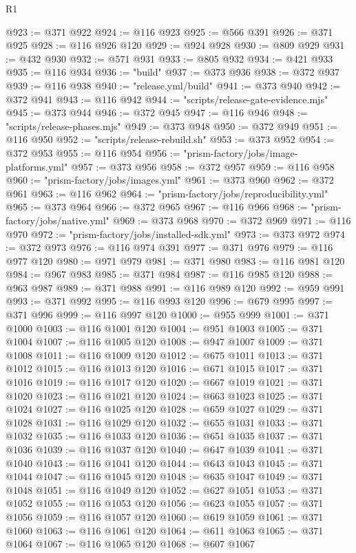 \begin{lexlean}{R1}
\begin{coremodule}
@923 := @371 @922
@924 := @116 @923
@925 := @566 @391
@926 := @371 @925
@928 := @116 @926 @120
@929 := @924 @928
@930 := @809 @929
@931 := @432 @930
@932 := @571 @931
@933 := @805 @932
@934 := @421 @933
@935 := @116 @934
@936 := "build"
@937 := @373 @936
@938 := @372 @937
@939 := @116 @938
@940 := "release.yml/build"
@941 := @373 @940
@942 := @372 @941
@943 := @116 @942
@944 := "scripts/release-gate-evidence.mjs"
@945 := @373 @944
@946 := @372 @945
@947 := @116 @946
@948 := "scripts/release-phases.mjs"
@949 := @373 @948
@950 := @372 @949
@951 := @116 @950
@952 := "scripts/release-rebuild.sh"
@953 := @373 @952
@954 := @372 @953
@955 := @116 @954
@956 := "prism-factory/jobs/image-platforms.yml"
@957 := @373 @956
@958 := @372 @957
@959 := @116 @958
@960 := "prism-factory/jobs/images.yml"
@961 := @373 @960
@962 := @372 @961
@963 := @116 @962
@964 := "prism-factory/jobs/reproducibility.yml"
@965 := @373 @964
@966 := @372 @965
@967 := @116 @966
@968 := "prism-factory/jobs/native.yml"
@969 := @373 @968
@970 := @372 @969
@971 := @116 @970
@972 := "prism-factory/jobs/installed-sdk.yml"
@973 := @373 @972
@974 := @372 @973
@976 := @116 @974 @391
@977 := @371 @976
@979 := @116 @977 @120
@980 := @971 @979
@981 := @371 @980
@983 := @116 @981 @120
@984 := @967 @983
@985 := @371 @984
@987 := @116 @985 @120
@988 := @963 @987
@989 := @371 @988
@991 := @116 @989 @120
@992 := @959 @991
@993 := @371 @992
@995 := @116 @993 @120
@996 := @679 @995
@997 := @371 @996
@999 := @116 @997 @120
@1000 := @955 @999
@1001 := @371 @1000
@1003 := @116 @1001 @120
@1004 := @951 @1003
@1005 := @371 @1004
@1007 := @116 @1005 @120
@1008 := @947 @1007
@1009 := @371 @1008
@1011 := @116 @1009 @120
@1012 := @675 @1011
@1013 := @371 @1012
@1015 := @116 @1013 @120
@1016 := @671 @1015
@1017 := @371 @1016
@1019 := @116 @1017 @120
@1020 := @667 @1019
@1021 := @371 @1020
@1023 := @116 @1021 @120
@1024 := @663 @1023
@1025 := @371 @1024
@1027 := @116 @1025 @120
@1028 := @659 @1027
@1029 := @371 @1028
@1031 := @116 @1029 @120
@1032 := @655 @1031
@1033 := @371 @1032
@1035 := @116 @1033 @120
@1036 := @651 @1035
@1037 := @371 @1036
@1039 := @116 @1037 @120
@1040 := @647 @1039
@1041 := @371 @1040
@1043 := @116 @1041 @120
@1044 := @643 @1043
@1045 := @371 @1044
@1047 := @116 @1045 @120
@1048 := @635 @1047
@1049 := @371 @1048
@1051 := @116 @1049 @120
@1052 := @627 @1051
@1053 := @371 @1052
@1055 := @116 @1053 @120
@1056 := @623 @1055
@1057 := @371 @1056
@1059 := @116 @1057 @120
@1060 := @619 @1059
@1061 := @371 @1060
@1063 := @116 @1061 @120
@1064 := @611 @1063
@1065 := @371 @1064
@1067 := @116 @1065 @120
@1068 := @607 @1067

\end{coremodule}
\end{lexlean}
